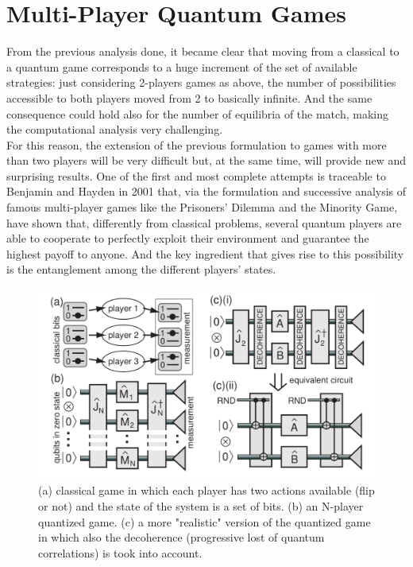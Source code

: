 \hfill

\section{Multi-Player Quantum Games}
From the previous analysis done, it became clear that moving from a classical to a quantum game corresponds to a huge increment of the set of available strategies: just considering 2-players games as above, the number of possibilities accessible to both players moved from 2 to basically infinite. And the same consequence could hold also for the number of equilibria of the match, making the computational analysis very challenging.\\
For this reason, the extension of the previous formulation to games with more than two players will be very difficult but, at the same time, will provide new and surprising results. One of the first and most complete attempts is traceable to Benjamin and Hayden \cite{Benjamin_2001} in 2001 that, via the formulation and successive analysis of famous multi-player games like the Prisoners' Dilemma and the Minority Game, have shown that, differently from classical problems, several quantum players are able to cooperate to perfectly exploit their environment and guarantee the highest payoff to anyone. And the key ingredient that gives rise to this possibility is the entanglement among the different players' states.\\
\begin{figure}[t]
	\centering
	\includegraphics[scale=0.2]{pictures/multiplayer.pdf}
	\caption{(a) classical game in which each player has two actions available (flip or not) and the state of the system is a set of bits. (b) an N-player quantized game. (c) a more "realistic" version of the quantized game in which also the decoherence (progressive lost of quantum correlations) is took into account.}
	\label{fig:multi}
\end{figure}
